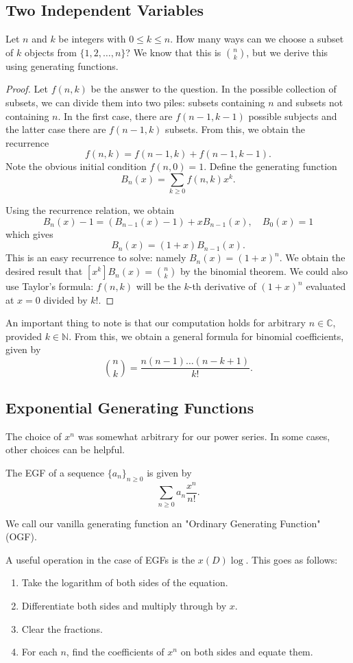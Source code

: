 \documentclass[11pt]{article}
\newcommand{\N}{\mathbb{N}}
\newcommand{\C}{\mathbb C}
\renewcommand{\>}{\rangle}
\newcommand{\<}{\langle}
\begin{document}
\subsection{Two Independent Variables}
Let $n$ and $k$ be integers with $0 \le k \le n$.  How many ways can we choose a subset of $k$ objects from $\{1, 2, \dots, n\}$?  We know that this is $\binom{n}{k}$, but we derive this using generating functions.
\begin{proof}
Let $f(n, k)$ be the answer to the question. In the possible collection of subsets, we can divide them into two piles: subsets containing $n$ and subsets not containing $n$.  In the first case, there are $f(n-1, k-1)$ possible subjects and the latter case there are $f(n-1, k)$ subsets.  From this, we obtain the recurrence
$$f(n, k) = f(n-1, k) + f(n-1, k-1).$$
Note the obvious initial condition $f(n, 0) = 1$.  Define the generating function
$$B_n(x) = \sum_{k \ge 0} f(n, k) x^k.$$

Using the recurrence relation, we obtain
$$B_n(x) - 1 = (B_{n-1}(x) - 1) + xB_{n-1}(x), \quad B_0(x) = 1$$
which gives
$$B_n(x) = (1 + x)B_{n-1}(x).$$
This is an easy recurrence to solve: namely $B_n(x) = (1 + x)^n$.  We obtain the desired result that $[x^k]B_n(x) = \binom{n}{k}$ by the binomial theorem.  We could also use Taylor's formula: $f(n, k)$ will be the $k$-th derivative of $(1 + x)^n$ evaluated at $x = 0$ divided by $k!$.
\end{proof}
An important thing to note is that our computation holds for arbitrary $n \in \C$, provided $k \in \N$.  From this, we obtain a general formula for binomial coefficients, given by 
$$\binom{n}{k} = \frac{n(n-1) \dots (n-k + 1)}{k!}.$$

\subsection{Exponential Generating Functions}
The choice of $x^n$ was somewhat arbitrary for our power series.  In some cases, other choices can be helpful.
\begin{definition} The EGF of a sequence $\{a_n\}_{n \ge 0}$ is given by 
$$\sum_{n \ge 0} a_n \frac{x^n}{n!}.$$
\end{definition}
We call our vanilla generating function an "Ordinary Generating Function"(OGF).

A useful operation in the case of EGFs is the $x(D)\log$.  This goes as follows:
\begin{enumerate}
\item Take the logarithm of both sides of the equation.
\item Differentiate both sides and multiply through by $x$.
\item Clear the fractions.
\item For each $n$, find the coefficients of $x^n$ on both sides and equate them.  
\end{enumerate}
\pagebreak
\end{document}
